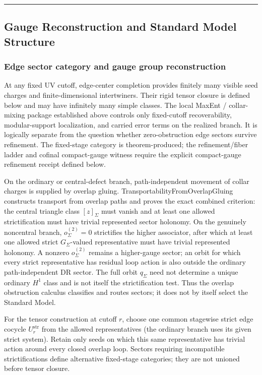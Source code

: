 \begin{center}\rule{0.5\linewidth}{0.5pt}\end{center}
\subsection{Gauge Reconstruction and Standard Model Structure}\label{6-gauge-reconstruction-and-standard-model-structure}

\subsubsection{Edge sector category and gauge group reconstruction}\label{61-edge-sector-category-and-gauge-group-reconstruction}

At any fixed UV cutoff, edge-center completion provides finitely many visible seed charges and finite-dimensional intertwiners. Their rigid tensor closure is defined below and may have infinitely many simple classes. The local MaxEnt / collar-mixing package established above controls only fixed-cutoff recoverability, modular-support localization, and carried error terms on the realized branch. It is logically separate from the question whether zero-obstruction edge sectors survive refinement. The fixed-stage category is theorem-produced; the refinement/fiber ladder and cofinal compact-gauge witness require the explicit compact-gauge refinement receipt defined below.

On the ordinary or central-defect branch, path-independent movement of collar charges is supplied by overlap gluing. TransportabilityFromOverlapGluing constructs transport from overlap paths and proves the exact combined criterion: the central triangle class \([z]_\Sigma\) must vanish and at least one allowed strictification must have trivial represented sector holonomy. On the genuinely noncentral branch, \(o^{(2)}_\Sigma=0\) strictifies the higher associator, after which at least one allowed strict \(G_\Sigma\)-valued representative must have trivial represented holonomy. A nonzero \(o^{(2)}_\Sigma\) remains a higher-gauge sector; an orbit for which every strict representative has residual loop action is also outside the ordinary path-independent DR sector. The full orbit \(q_\Sigma\) need not determine a unique ordinary \(H^1\) class and is not itself the strictification test. Thus the overlap obstruction calculus classifies and routes sectors; it does not by itself select the Standard Model.

For the tensor construction at cutoff \(r\), choose one common stagewise strict edge cocycle
\(U^{\mathrm{str}}_r\) from the allowed representatives (the ordinary branch uses its given
strict system). Retain only seeds on which this same representative has trivial action around
every closed overlap loop. Sectors requiring incompatible strictifications define alternative
fixed-stage categories; they are not unioned before tensor closure.

